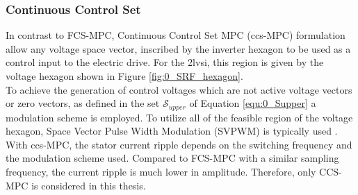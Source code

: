\subsubsection{Continuous Control Set}
In contrast to FCS-MPC, Continuous Control Set MPC (\acrshort{ccs}-MPC) formulation allow any voltage space vector, inscribed by the inverter hexagon to be used as a control input to the electric drive. For the \acrshort{2lvsi}, this region is given by the voltage hexagon shown in Figure \ref{fig:0_SRF_hexagon}.\\
To achieve the generation of control voltages which are not active voltage vectors or zero vectors, as defined in the set $\mathcal{S}_{upper}$ of Equation \eqref{equ:0_Supper} a modulation scheme is employed. To utilize all of the feasible region of the voltage hexagon, Space Vector Pulse Width Modulation (SVPWM) is typically used \cite{InverterStruct}. With \acrshort{ccs}-MPC, the stator current ripple depends on the switching frequency and the modulation scheme used. Compared to FCS-MPC with a similar sampling frequency, the current ripple is much lower in amplitude. Therefore, only CCS-MPC is considered in this thesis.


